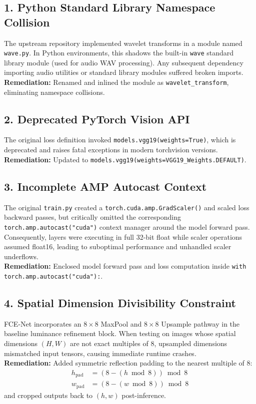 \documentclass[10pt,twocolumn,letterpaper]{article}
\begin{document}
\subsection{1. Python Standard Library Namespace Collision}
The upstream repository implemented wavelet transforms in a module named \texttt{wave.py}. In Python environments, this shadows the built-in \texttt{wave} standard library module (used for audio WAV processing). Any subsequent dependency importing audio utilities or standard library modules suffered broken imports. \\
\textbf{Remediation:} Renamed and inlined the module as \texttt{wavelet\_transform}, eliminating namespace collisions.

\subsection{2. Deprecated PyTorch Vision API}
The original loss definition invoked \texttt{models.vgg19(weights=True)}, which is deprecated and raises fatal exceptions in modern torchvision versions. \\
\textbf{Remediation:} Updated to \texttt{models.vgg19(weights=VGG19\_Weights.DEFAULT)}.

\subsection{3. Incomplete AMP Autocast Context}
The original \texttt{train.py} created a \texttt{torch.cuda.amp.GradScaler()} and scaled loss backward passes, but critically omitted the corresponding \texttt{torch.amp.autocast("cuda")} context manager around the model forward pass. Consequently, layers were executing in full 32-bit float while scaler operations assumed float16, leading to suboptimal performance and unhandled scaler underflows. \\
\textbf{Remediation:} Enclosed model forward pass and loss computation inside \texttt{with torch.amp.autocast("cuda"):}.

\subsection{4. Spatial Dimension Divisibility Constraint}
FCE-Net incorporates an $8\times8$ MaxPool and $8\times8$ Upsample pathway in the baseline luminance refinement block. When testing on images whose spatial dimensions $(H, W)$ are not exact multiples of 8, upsampled dimensions mismatched input tensors, causing immediate runtime crashes. \\
\textbf{Remediation:} Added symmetric reflection padding to the nearest multiple of 8:
\begin{equation}
\begin{aligned}
h_{\text{pad}} &= (8 - (h \bmod 8)) \bmod 8 \\
w_{\text{pad}} &= (8 - (w \bmod 8)) \bmod 8
\end{aligned}
\end{equation}
and cropped outputs back to $(h, w)$ post-inference.
\end{document}

